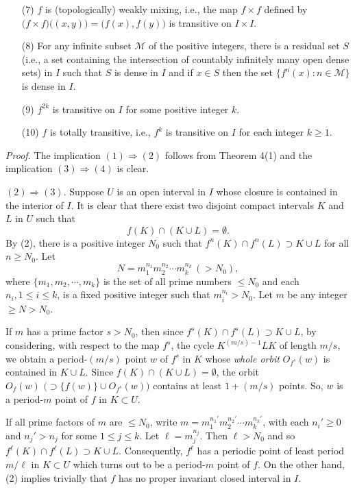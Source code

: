 \documentclass[12pt]{article}
\begin{document}
{\begin{itemize}
\item[{\rm (7)}]
$f$ is (topologically) weakly mixing, i.e., the map $f \times f$ defined by $\big(f \times f\big)\big((x, y)\big) = \big(f(x), f(y)\big)$ is transitive on $I \times I$.   

\item[{\rm (8)}]
For any infinite subset $\mathcal M$ of the positive integers, there is a residual set $S$ \big(i.e., a set containing the intersection of countably infinitely many open dense sets\big) in $I$ such that $S$ is dense in $I$ and if $x \in S$ then the set $\big\{ f^n(x) : n \in \mathcal M \big\}$ is dense in $I$.  

\item[{\rm (9)}]   
$f^{2k}$ is transitive on $I$ for some positive integer $k$.   

\item[{\rm (10)}]
$f$ is totally transitive, i.e., $f^k$ is transitive on $I$ for each integer $k \ge 1$. 
\end{itemize}}

\noindent
{\it Proof.}
The implication ${(1)} \Rightarrow {(2)}$ follows from Theorem 4(1) and the implication ${(3)} \Rightarrow {(4)}$ is clear.  

${(2)} \Rightarrow {(3)}$.  Suppose $U$ is an open interval in $I$ whose closure is contained in the interior of $I$.  It is clear that there exist two disjoint compact intervals $K$ and $L$ in $U$ such that 
$$
f(K) \cap (K \cup L) = \emptyset.
$$
By {(2)}, there is a positive integer $N_0$ such that $f^n(K) \cap f^n(L) \supset K \cup L$ for all $n \ge N_0$.  Let 
$$
N = m_1^{n_1}m_2^{n_2} \cdots m_k^{n_k} \, (> N_0),
$$
where $\{ m_1, m_2, \cdots, m_k \}$ is the set of all prime numbers $\le N_0$ and each $n_i, 1 \le i \le k$, is a fixed positive integer such that $m_i^{n_i} > N_0$. Let $m$ be any integer $\ge N > N_0$.  

If $m$ has a prime factor $s > N_0$, then since $f^s(K) \cap f^s(L) \supset K \cup L$, by considering, with respect to the map $f^s$, the cycle $K^{(m/s)-1}LK$ of length $m/s$, we obtain a period-$(m/s)$ point $w$ of $f^s$ in $K$ whose {\it whole orbit} $O_{f^s}(w)$ is contained in $K \cup L$.  Since $f(K) \cap (K \cup L) = \emptyset$, the orbit $O_f(w) \,\, \big(\supset \big\{ f(w) \big\} \cup O_{f^s}(w)\big)$ contains at least $1 + (m/s)$ points.  So, $w$ is a period-$m$ point of $f$ in $K \subset U$.  

If all prime factors of $m$ are $\le N_0$, write $m = m_1^{n_1'}m_2^{n_2'} \cdots m_k^{n_k'}$, with each $n_i' \ge 0$ and $n_j' > n_j$ for some $1 \le j \le k$.  Let $\ell = m_j^{n_j}$.  Then $\ell > N_0$ and so $f^\ell(K) \cap f^\ell(L) \supset K \cup L$.  Consequently, $f^\ell$ has a periodic point of least period $m/\ell$ in $K \subset U$ which turns out to be a period-$m$ point of $f$.  On the other hand, (2) implies trivially that $f$ has no proper invariant closed interval in $I$.  
\end{document}
